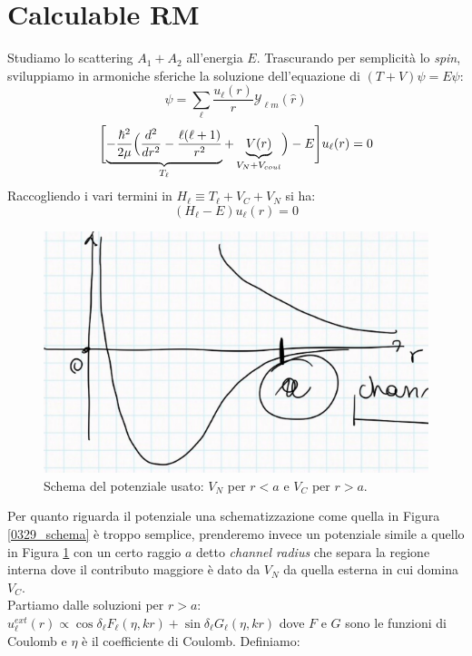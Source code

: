 \section{Calculable RM}\label{sec-RM-C}
Studiamo lo scattering $A_1 + A_2$ all'energia $E$. Trascurando per semplicità lo \textit{spin}, sviluppiamo in armoniche sferiche la soluzione dell'equazione di \Sch{} $(T+V)\psi = E\psi$:
$$\psi = \sum_\ell \frac{u_\ell (r)}{r}\mathcal{Y}_{\ell m}(\hat{r})$$
$$\Biggl [ \underbrace{-\frac{\hbar^2}{2\mu}\Bigl (\frac{d^2}{dr^2} -\frac{\ell(\ell+1)}{r^2}}_{T_\ell}+\underbrace{V(r)}_{V_N + V_{coul}}\Bigr )-E \Biggr ] u_\ell(r) =0$$
Raccogliendo i vari termini in $H_\ell\equiv T_\ell + V_C + V_N$ si ha:
\begin{equation}\label{0412_sch}
	(H_\ell - E) u_\ell (r) =0
\end{equation}
\begin{figure}[h]
	\centering
	\includegraphics[scale=0.5]{Immagini/0412_potschem.png}
	\caption{Schema del potenziale usato: $V_N$ per $r<a$ e $V_C$ per $r>a$.}
	\label{0412_pot}
\end{figure}
\noindent Per quanto riguarda il potenziale una schematizzazione come quella in Figura \ref{0329_schema} è troppo semplice, prenderemo invece un potenziale simile a quello in Figura \ref{0412_pot} con un certo raggio $a$ detto \textit{channel radius} che separa la regione interna dove il contributo maggiore è dato da $V_N$ da quella esterna in cui domina $V_C$.\\ 
Partiamo dalle soluzioni per $r>a$:
$u_\ell^{ext} (r) \propto \cos{\delta_\ell} F_\ell (\eta, kr) + \sin{\delta_\ell}G_\ell (\eta,kr)$
dove $F$ e $G$ sono le funzioni di Coulomb e $\eta$ è il coefficiente di Coulomb. Definiamo:
